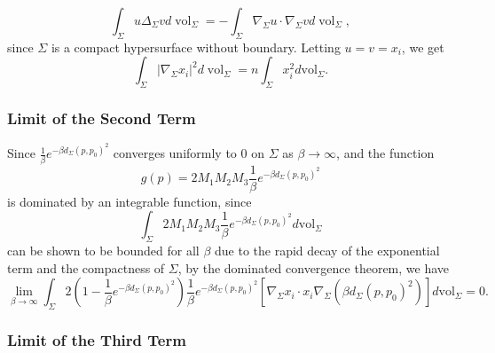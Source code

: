 \documentclass[a4, 12pt]{amsart}
\numberwithin{equation}{section} \numberwithin{equation}{section}
\begin{document}
\begin{equation*}\int_{\Sigma} u \Delta_{\Sigma} v d \operatorname{vol}_{\Sigma}=-\int_{\Sigma} \nabla_{\Sigma} u \cdot \nabla_{\Sigma} v d\operatorname{vol}_{\Sigma},\end{equation*}  since $\Sigma$ is a compact hypersurface without boundary. Letting $u=v=x_{i}$, we get \begin{equation*}\int_{\Sigma}\left|\nabla_{\Sigma} x_{i}\right|^{2} d \operatorname{vol}_{\Sigma}=n \int_{\Sigma} x_{i}^{2} d \mathrm{vol}_{\Sigma}.\end{equation*}












\subsubsection{Limit of the Second Term}


Since $\frac{1}{\beta} e^{-\beta d_{\Sigma}\left(p, p_{0}\right)^{2}}$ converges uniformly to 0 on $\Sigma$ as $\beta \rightarrow \infty$, and the function
\begin{equation*}g(p)=2 M_{1} M_{2} M_{3} \frac{1}{\beta} e^{-\beta d_\Sigma\left(p, p_{0}\right)^{2}}\end{equation*} is dominated by an integrable function, since
$$\int_{\Sigma} 2 M_{1} M_{2} M_{3} \frac{1}{\beta} e^{-\beta d_{\Sigma}\left(p, p_{0}\right)^{2}} d \mathrm{vol}_{\Sigma}$$ can be shown to be bounded for all $\beta$ due to the rapid decay of the exponential term and the compactness of $\Sigma$, by the dominated convergence theorem, we have
\begin{equation*}
\lim _{\beta \rightarrow \infty} \int_{\Sigma} 2\left(1-\frac{1}{\beta} e^{-\beta d_{\Sigma}\left(p, p_{0}\right)^{2}}\right) \frac{1}{\beta} e^{-\beta d_{\Sigma}\left(p, p_{0}\right)^{2}} \left[\nabla_{\Sigma} x_{i} \cdot x_{i} \nabla_{\Sigma}\left(\beta d_{\Sigma}\left(p, p_{0}\right)^{2}\right)\right] d \mathrm{vol}_{\Sigma}=0.
\end{equation*}

\subsubsection{Limit of the Third Term}
\end{document}

